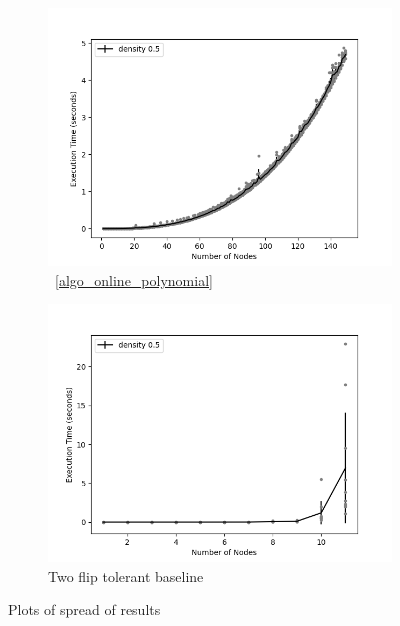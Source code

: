 \documentclass[sigplan,review,anonymous]{acmart}
\begin{document}
{\begin{figure}
    \begin{subfigure}{0.5\linewidth}
      \includegraphics[width=.8\linewidth]{variance_10_Polynomial.png}
      \caption{~\ref{algo_online_polynomial}}
      \label{fig:sfigPolynomialSpread}
    \end{subfigure}
    
    \begin{subfigure}{0.5\linewidth}
      \includegraphics[width=.8\linewidth]{variance_10_TwoFlip.png}
      \caption{Two flip tolerant baseline}
      \label{fig:sfigTwoFlipSpread}
    \end{subfigure}

    \caption{Plots of spread of results}
    \label{fig:variance}
\end{figure}

}
\end{document}
